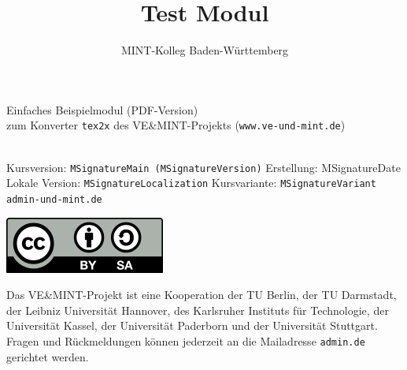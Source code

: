 


\graphicspath{{./../static/}}

\title{Test Modul}
\author{MINT-Kolleg Baden-W\"urttemberg}



\MSetSubject{\MINTMathematics}

\begin{framed}
\begin{center}
\LARGE
Einfaches Beispielmodul (PDF-Version)\\
\large
zum Konverter \texttt{tex2x} des VE\&MINT-Projekts (\texttt{www.ve-und-mint.de})
\end{center}
\ \\

Kursversion:  \texttt{MSignatureMain (MSignatureVersion)}
Erstellung:  MSignatureDate\\
Lokale Version:  \texttt{MSignatureLocalization}
Kursvariante: \texttt{MSignatureVariant}\\
\scriptsize \texttt{admin\@@ve-und-mint.de}
\end{framed}


\begin{center}
\includegraphics[scale=0.45]{cclbysa.png}
\end{center}


Das VE\&MINT-Projekt ist eine Kooperation der TU Berlin, der TU Darmstadt, der Leibniz Universität Hannover, des Karlsruher
Instituts für Technologie, der Universität Kassel, der Universität Paderborn und der Universität Stuttgart.
Fragen und Rückmeldungen können jederzeit an die Mailadresse \texttt{admin\@@veundmint.de} gerichtet werden.

\Mtableofcontents


\MPrintIndex


